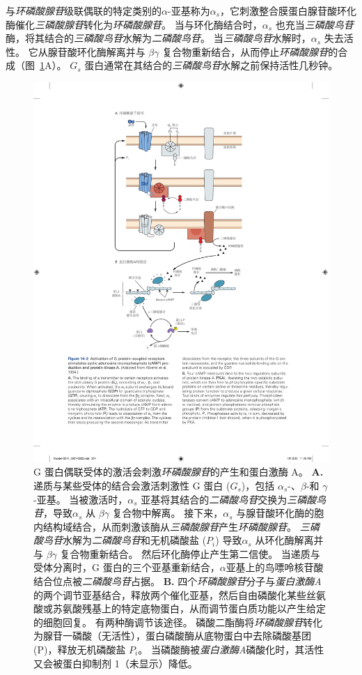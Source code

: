 与\textit{环磷酸腺苷}级联偶联的特定类别的$\alpha$-亚基称为$\alpha_s$，它刺激整合膜蛋白腺苷酸环化酶催化\textit{三磷酸腺苷}转化为\textit{环磷酸腺苷}。
当与环化酶结合时，$\alpha_s$ 也充当\textit{三磷酸鸟苷}酶，将其结合的\textit{三磷酸鸟苷}水解为\textit{二磷酸鸟苷}。
当\textit{三磷酸鸟苷}水解时，$\alpha_s$ 失去活性。
它从腺苷酸环化酶解离并与 $\beta \gamma$ 复合物重新结合，从而停止\textit{环磷酸腺苷}的合成（图~\ref{fig:14_2}A）。
$ G_s $ 蛋白通常在其结合的\textit{三磷酸鸟苷}水解之前保持活性几秒钟。


\begin{figure}[htbp]
	\centering
	\includegraphics[width=0.65\linewidth]{chap14/fig_14_2}
	\caption{G 蛋白偶联受体的激活会刺激\textit{环磷酸腺苷}的产生和蛋白激酶 A\cite{alberts2017molecular}。
		\textbf{A.} 递质与某些受体的结合会激活刺激性 G 蛋白 ($ G_s $)，包括 $\alpha_s$-、$\beta$-和 $\gamma$-亚基。
		当被激活时，$\alpha_s$ 亚基将其结合的\textit{二磷酸鸟苷}交换为\textit{三磷酸鸟苷}，导致$\alpha_s$ 从 $\beta \gamma$ 复合物中解离。
		接下来，$\alpha_s$ 与腺苷酸环化酶的胞内结构域结合，从而刺激该酶从\textit{三磷酸腺苷}产生\textit{环磷酸腺苷}。
		\textit{三磷酸鸟苷}水解为\textit{二磷酸鸟苷}和无机磷酸盐 ($ P_i $) 导致$\alpha_s$ 从环化酶解离并与 $\beta \gamma$ 复合物重新结合。
		然后环化酶停止产生第二信使。
		当递质与受体分离时，G 蛋白的三个亚基重新结合，$\alpha$亚基上的鸟嘌呤核苷酸结合位点被\textit{二磷酸鸟苷}占据。
		\textbf{B.} 四个\textit{环磷酸腺苷}分子与\textit{蛋白激酶A}的两个调节亚基结合，释放两个催化亚基，然后自由磷酸化某些丝氨酸或苏氨酸残基上的特定底物蛋白，从而调节蛋白质功能以产生给定的细胞回复。
		有两种酶调节该途径。
		磷酸二酯酶将\textit{环磷酸腺苷}转化为腺苷一磷酸（无活性），蛋白磷酸酶从底物蛋白中去除磷酸基团 (P)，释放无机磷酸盐 $ P_i $。
		当磷酸酶被\textit{蛋白激酶A}磷酸化时，其活性又会被蛋白抑制剂 1（未显示）降低。}
	\label{fig:14_2}
\end{figure}


